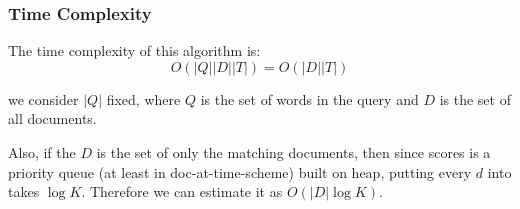 \subsubsection{Time Complexity}

The time complexity of this algorithm is:
\begin{equation}
    O(|Q| |D| |T|) = O(|D| |T|)
\end{equation}

we consider $|Q|$ fixed, where $Q$ is the set of words in the query and $D$ is the set of all documents.

Also, if the $D$ is the set of only the matching documents, then
since scores is a priority queue (at least in doc-at-time-scheme) built on heap, 
putting every $d$ into takes $\log K$. Therefore we can estimate it as $O(|D| \log K )$.~\cite{tfidfComplexity}


